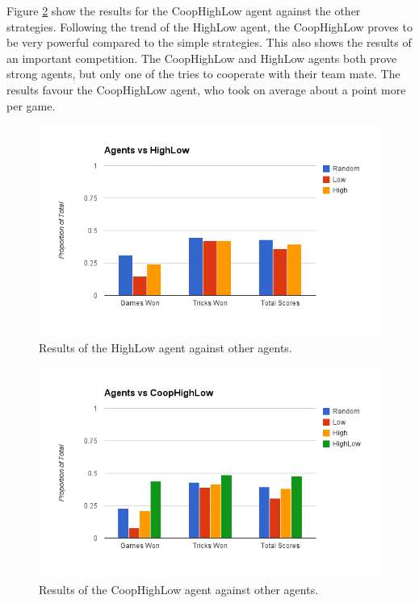 Figure \ref{fig:results_coophighlow} show the results for the CoopHighLow agent against the other strategies. Following the trend of 
the HighLow agent, the CoopHighLow proves to be very powerful compared to the simple strategies. This also shows the results of an
important competition. The CoopHighLow and HighLow agents both prove strong agents, but only one of the tries to cooperate with
their team mate. The results favour the CoopHighLow agent, who took on average about a point more per game.

\begin{figure}[h]
    \centering
    \includegraphics[scale=0.5]{data/highlow.png}
    \caption{Results of the HighLow agent against other agents.}
    \label{fig:results_highlow}
\end{figure}

\begin{figure}[h]
    \centering
    \includegraphics[scale=0.5]{data/coophighlow.png}
    \caption{Results of the CoopHighLow agent against other agents.}
    \label{fig:results_coophighlow}
\end{figure}


